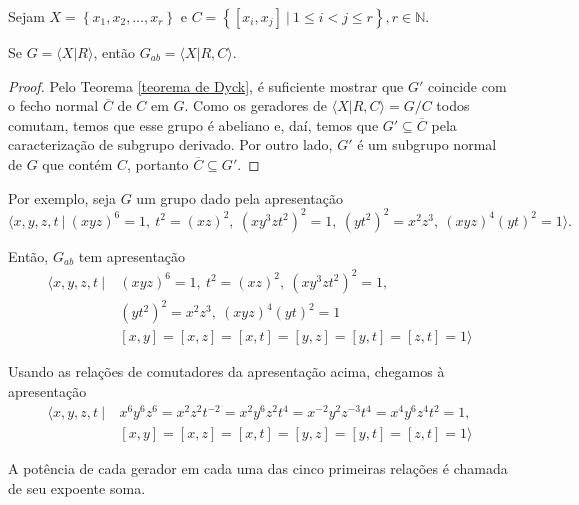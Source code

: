     	\par\vspace{0.3cm} Sejam  
    	$X = \left\{ x_1, x_2, \dots, x_r \right\}$ e $C = \left\{ [x_i, x_j] \ | \ 1\leq i < j \leq r \right\},
    	r\in\mathbb{N}$.
    	\begin{prop}
    	\label{apresentacao abelianizacao}
    		Se $G = \langle X|R \rangle$, então $G_{ab} = \langle X|R,C \rangle$.
    	\end{prop}
    	\begin{proof}
    		Pelo Teorema \eqref{teorema de Dyck}, é suficiente mostrar que $G'$ coincide com o fecho normal
    		$\overline{C}$ de $C$ em $G$. Como os geradores de $\langle X|R,C \rangle = G/C$ todos comutam, 
    		temos que esse grupo é abeliano e, daí, temos que $G'\subseteq \overline{C}$ pela caracterização 
    		de subgrupo derivado. Por outro lado, $G'$ é um subgrupo normal de $G$ que contém $C$, portanto
    		$\overline{C}\subseteq G'$.
    	\end{proof}
    	\par\vspace{0.3cm} Por exemplo, seja $G$ um grupo dado pela apresentação
    	\begin{equation*}
    	    \langle x,y,z,t \ | \ (xyz)^6 = 1, \ t^2 = (xz)^2, \ (xy^3zt^2)^2 = 1, \ (yt^2)^2 = x^2z^3, 
    	    \ (xyz)^4(yt)^2 = 1 \rangle.
    	\end{equation*}
    	\par\vspace{0.3cm} Então, $G_{ab}$ tem apresentação
    	\begin{align*}
    	    \langle x,y,z,t \ | \ &(xyz)^6 = 1, \ t^2 = (xz)^2, \ (xy^3zt^2)^2 = 1, \\ 
        	&(yt^2)^2 = x^2z^3, \ (xyz)^4(yt)^2 = 1 \\ 
        	&[x,y] = [x,z] = [x,t] = [y,z] = [y,t] = [z,t] = 1\rangle
    	\end{align*}
    	\par\vspace{0.3cm} Usando as relações de comutadores da apresentação acima, chegamos à apresentação
    	\begin{align*}
        	\langle x,y,z,t \ | \ &x^6y^6z^6 = x^2z^2t^{-2} = x^2y^6z^2t^4 = x^{-2}y^2z^{-3}t^4 
        	= x^4y^6z^4t^2 = 1, \\
        	&[x,y] = [x,z] = [x,t] = [y,z] = [y,t] = [z,t] = 1
        	\rangle
    	\end{align*}
    	\par\vspace{0.3cm} A potência de cada gerador em cada uma das cinco primeiras relações é 
    	chamada de seu expoente soma.
    	
